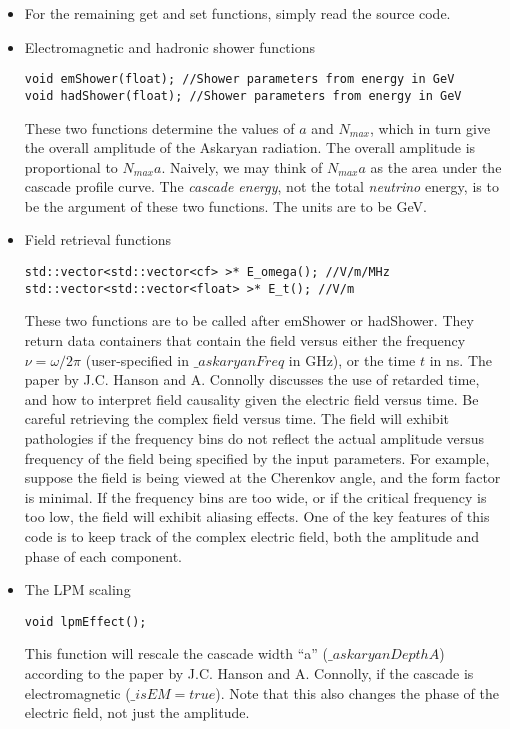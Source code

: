 \documentclass[10pt]{article}
\begin{document}
\begin{itemize}
\item For the remaining get and set functions, simply read the source code.
\item Electromagnetic and hadronic shower functions
\begin{verbatim}
void emShower(float); //Shower parameters from energy in GeV
void hadShower(float); //Shower parameters from energy in GeV
\end{verbatim}
These two functions determine the values of $a$ and $N_{max}$, which in turn give the overall amplitude of the Askaryan radiation.  The overall amplitude is proportional to $N_{max} a$.  Naively, we may think of $N_{max}a$ as the area under the cascade profile curve.  The \textit{cascade energy}, not the total \textit{neutrino} energy, is to be the argument of these two functions.  The units are to be GeV.
\item Field retrieval functions
\begin{verbatim}
std::vector<std::vector<cf> >* E_omega(); //V/m/MHz
std::vector<std::vector<float> >* E_t(); //V/m
\end{verbatim}
These two functions are to be called after emShower or hadShower.  They return data containers that contain the field versus either the frequency $\nu = \omega/2\pi$ (user-specified in $\_askaryanFreq$ in GHz), or the time $t$ in ns.  The paper by J.C. Hanson and A. Connolly discusses the use of retarded time, and how to interpret field causality given the electric field versus time.  Be careful retrieving the complex field versus time.  The field will exhibit pathologies if the frequency bins do not reflect the actual amplitude versus frequency of the field being specified by the input parameters.  For example, suppose the field is being viewed at the Cherenkov angle, and the form factor is minimal.  If the frequency bins are too wide, or if the critical frequency is too low, the field will exhibit aliasing effects.  One of the key features of this code is to keep track of the complex electric field, both the amplitude and phase of each component.
\item The LPM scaling
\begin{verbatim}
void lpmEffect();
\end{verbatim}
This function will rescale the cascade width ``a'' ($\_askaryanDepthA$) according to the paper by J.C. Hanson and A. Connolly, if the cascade is electromagnetic ($\_isEM = true$).  Note that this also changes the phase of the electric field, not just the amplitude.
\end{itemize}
\end{document}
